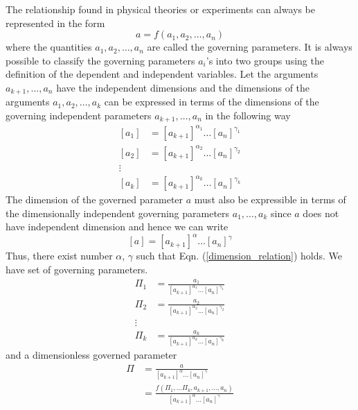 The relationship found in physical theories or experiments can always be represented in the form
\begin{equation}
a = f (a_1, a_2, \ldots, a_n)
\label{def:governed_governing}
\end{equation}
where the quantities $a_1, a_2, \ldots, a_n$ are called the governing parameters. It is always possible to classify the governing parameters $a_i$'s into two groups using the definition of the dependent and independent variables. Let the arguments $a_{k+1},\ldots,a_n$ have the independent dimensions and the dimensions of the arguments $a_1, a_2, \ldots, a_k$ can be expressed in terms of the dimensions of the governing independent parameters $a_{k+1}, \ldots, a_n$ in the following way
\begin{align}
	\left[a_1\right] &= \left[a_{k+1}\right]^{\alpha_1} 
	\ldots \left[a_n\right]^{\gamma_1} \nonumber\\
	\left[a_2\right] &= \left[a_{k+1}\right]^{\alpha_2} \ldots \left[a_n\right]^{\gamma_2}\\
	\vdots \\
	\left[a_k\right] &= \left[a_{k+1}\right]^{\alpha_k} \ldots \left[a_n\right]^{\gamma_k} \nonumber
\end{align}
The dimension of the governed parameter $a$ must also be expressible in terms of the dimensionally independent governing parameters $a_1, \ldots, a_k$ since $a$ does not have independent dimension and hence we can write
\begin{equation}
	\left[a\right] = \left[a_{k+1}\right]^{\alpha} \ldots \left[a_n\right]^{\gamma}
	\label{dimension_relation}
\end{equation}
Thus, there exist number $\alpha$, $\gamma$ such that Eqn. (\ref{dimension_relation}) holds. We have set of governing parameters.
\begin{align}
	\Pi_1 &= \frac{a_1}{\left[a_{k+1}\right]^{\alpha_1} \ldots \left[a_{n}\right]^{\gamma_1}} \\
	\Pi_2 &= \frac{a_2}{\left[a_{k+1}\right]^{\alpha_2} \ldots \left[a_{n}\right]^{\gamma_2}} \\
	\vdots \\
	\Pi_k &= \frac{a_k}{\left[a_{k+1}\right]^{\alpha_k} \ldots \left[a_{n}\right]^{\gamma_k}}
\end{align}
and a dimensionless governed parameter
\begin{align}
\Pi 
&= \frac{a}{\left[a_{k+1}\right]^{\alpha} \ldots \left[a_n\right]^{\gamma}} \nonumber\\
&=\frac{f(\Pi_1, \ldots \Pi_k, a_{k+1}, \ldots, a_n)}{\left[a_{k+1}\right]^{\alpha} \ldots \left[a_n\right]^{\gamma}}
\label{dimensionless-pi-1}
\end{align}
